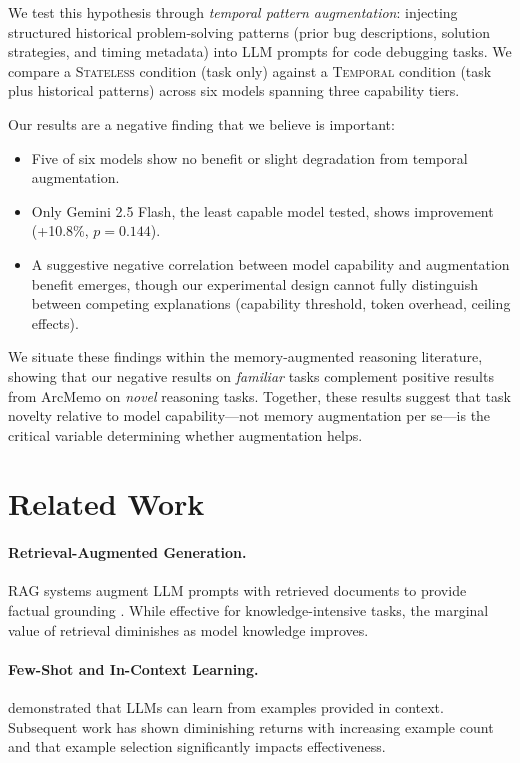 \documentclass[11pt]{article}
\begin{document}
We test this hypothesis through \emph{temporal pattern augmentation}: injecting structured historical problem-solving patterns (prior bug descriptions, solution strategies, and timing metadata) into LLM prompts for code debugging tasks. We compare a \textsc{Stateless} condition (task only) against a \textsc{Temporal} condition (task plus historical patterns) across six models spanning three capability tiers.

Our results are a negative finding that we believe is important:
\begin{itemize}[nosep]
    \item Five of six models show no benefit or slight degradation from temporal augmentation.
    \item Only Gemini 2.5 Flash, the least capable model tested, shows improvement (+10.8\%, $p = 0.144$).
    \item A suggestive negative correlation between model capability and augmentation benefit emerges, though our experimental design cannot fully distinguish between competing explanations (capability threshold, token overhead, ceiling effects).
\end{itemize}

We situate these findings within the memory-augmented reasoning literature, showing that our negative results on \emph{familiar} tasks complement positive results from ArcMemo \citep{ho2025arcmemo} on \emph{novel} reasoning tasks. Together, these results suggest that task novelty relative to model capability---not memory augmentation per se---is the critical variable determining whether augmentation helps.

\section{Related Work}
\label{sec:related}

\paragraph{Retrieval-Augmented Generation.} RAG systems augment LLM prompts with retrieved documents to provide factual grounding \citep{lewis2020retrieval}. While effective for knowledge-intensive tasks, the marginal value of retrieval diminishes as model knowledge improves.

\paragraph{Few-Shot and In-Context Learning.} \citet{brown2020language} demonstrated that LLMs can learn from examples provided in context. Subsequent work has shown diminishing returns with increasing example count \citep{min2022rethinking} and that example selection significantly impacts effectiveness.
\end{document}
